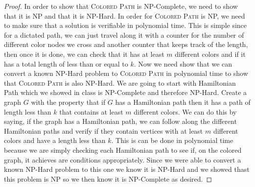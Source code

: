 \documentclass{article}
\begin{document}
\begin{proof}
In order to show that \textsc{Colored Path} is NP-Complete, we need to show that it is NP and that it is NP-Hard. In order for \textsc{Colored Path} is NP, we need to make sure that a solution is verifiable in polynomial time. This is simple since for a dictated path, we can just travel along it with a counter for the number of different color nodes we cross and another counter that keeps track of the length, then once it is done, we can check that it has at least $m$ different colors and if it has a total length of less than or equal to $k.$ Now we need show that we can convert a known NP-Hard problem to \textsc{Colored Path} in polynomial time to show that \textsc{Colored Path} is also NP-Hard. We are going to start with Hamiltonian Path which we showed in class is NP-Complete and therefore NP-Hard. Create a graph $G$ with the property that if $G$ has a Hamiltonian path then it has a path of length less than $k$ that contains at least $m$ different colors. We can do this by saying, if the graph has a Hamiltonian path, we can follow along the different Hamiltonian paths and verify if they contain vertices with at least $m$ different colors and have a length less than $k$. This is can be done in polynomial time because we are simply checking each Hamiltonian path to see if, on the colored graph, it achieves are conditions appropriately. Since we were able to convert a known NP-Hard problem to this one we know it is NP-Hard and we showed thast this problem is NP so we then know it is NP-Complete as desired.
\end{proof}
\end{document}
